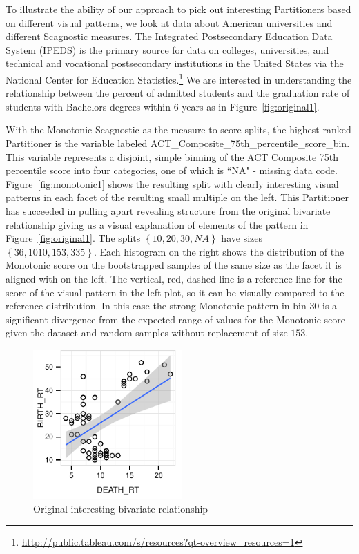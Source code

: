 To illustrate the ability of our approach to pick out interesting Partitioners based on different visual patterns, we look at data about American universities and different Scagnostic measures. The Integrated Postsecondary Education Data System (IPEDS) is the primary source for data on colleges, universities, and technical and vocational postsecondary institutions in the United States via the National Center for Education Statistics.\footnote{\url{http://public.tableau.com/s/resources?qt-overview_resources=1}} We are interested in understanding the relationship between the percent of admitted students and the graduation rate of students with Bachelors degrees within $6$ years as in Figure~\ref{fig:original1}. 


With the Monotonic Scagnostic as the measure to score splits, the highest ranked Partitioner is the variable labeled ACT\_Composite\_75th\_percentile\_score\_bin. This variable represents a disjoint, simple binning of the ACT Composite 75th percentile score into four categories, one of which is ``NA" - missing data code. Figure~\ref{fig:monotonic1} shows the resulting split with clearly interesting visual patterns in each facet of the resulting small multiple on the left. This Partitioner has succeeded in pulling apart revealing structure from the original bivariate relationship giving us a visual explanation of elements of the pattern in Figure~\ref{fig:original1}. 
The splits $\left\{{10, 20, 30, NA}\right\}$ have sizes $\left\{{36, 1010, 153, 335}\right\}$. Each histogram on the right shows the distribution of the Monotonic score on the bootstrapped samples of the same size as the facet it is aligned with on the left. The vertical, red, dashed line is a reference line for the score of the visual pattern in the left plot, so it can be visually compared to the reference distribution. In this case the strong Monotonic pattern in bin $30$ is a significant divergence from the expected range of values for the Monotonic score given the dataset and random samples without replacement of size $153$.


\begin{figure}
 \centering 
\includegraphics[width=2.25in,height=2.25in]{images/DEATH_RT-BIRTH_RT.pdf}
  \caption{Original interesting bivariate relationship}
 \label{fig:original2}
\end{figure}

